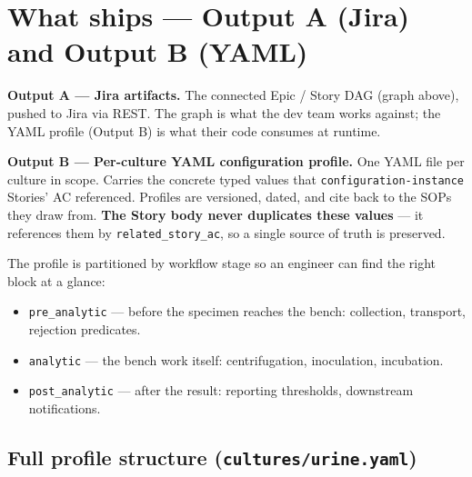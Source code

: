 \documentclass[10pt,letterpaper]{article}
\begin{document}
\section{What ships --- Output A (Jira) and Output B (YAML)}

\textbf{Output A --- Jira artifacts.} The connected Epic / Story DAG (graph above), pushed to Jira via REST. The graph is what the dev team works against; the YAML profile (Output B) is what their code consumes at runtime.

\textbf{Output B --- Per-culture YAML configuration profile.} One YAML file per culture in scope. Carries the concrete typed values that \texttt{configuration-instance} Stories' AC referenced. Profiles are versioned, dated, and cite back to the SOPs they draw from. \textbf{The Story body never duplicates these values} --- it references them by \texttt{related\_story\_ac}, so a single source of truth is preserved.

The profile is partitioned by workflow stage so an engineer can find the right block at a glance:
\begin{itemize}
  \item \texttt{pre\_analytic} --- before the specimen reaches the bench: collection, transport, rejection predicates.
  \item \texttt{analytic} --- the bench work itself: centrifugation, inoculation, incubation.
  \item \texttt{post\_analytic} --- after the result: reporting thresholds, downstream notifications.
\end{itemize}

\subsection{Full profile structure (\texttt{cultures/urine.yaml})}
\end{document}
